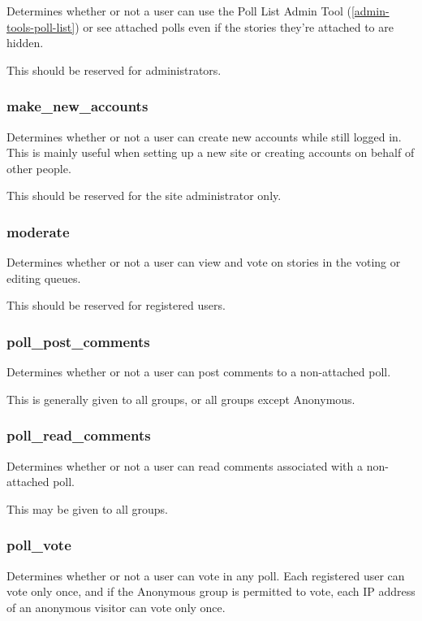 Determines whether or not a user can use the Poll List Admin Tool (\ref{admin-tools-poll-list}) or see attached polls even if the stories they're attached to are hidden.

This should be reserved for administrators.

\subsubsection{make\_new\_accounts}
\label{perm-make-new-accounts}

Determines whether or not a user can create new accounts while still logged in. This is mainly useful when setting up a new site or creating accounts on behalf of other people.

This should be reserved for the site administrator only.

\subsubsection{moderate}
\label{perm-moderate}

Determines whether or not a user can view and vote on stories in the voting or editing queues.

This should be reserved for registered users.

\subsubsection{poll\_post\_comments}
\label{perm-poll-post-comments}

Determines whether or not a user can post comments to a non-attached poll.

This is generally given to all groups, or all groups except Anonymous.

\subsubsection{poll\_read\_comments}
\label{perm-poll-read-comments}

Determines whether or not a user can read comments associated with a non-attached poll.

This may be given to all groups.

\subsubsection{poll\_vote}
\label{perm-poll-vote}

Determines whether or not a user can vote in any poll.  Each registered user can vote only once, and if the Anonymous group is permitted to vote, each IP address of an anonymous visitor can vote only once.

